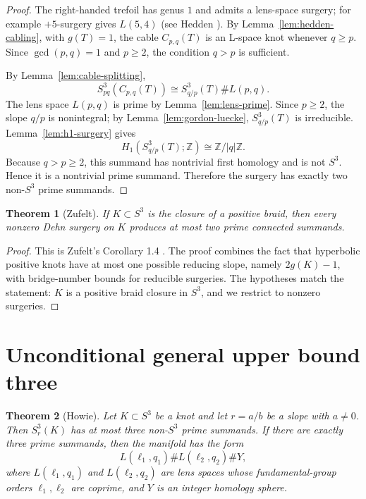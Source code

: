 \documentclass[12pt]{article}
\newtheorem{theorem}{Theorem}[section]
\theoremstyle{definition}
\newcommand{\Z}{\mathbb Z}
\begin{document}
\begin{proof}
The right-handed trefoil has genus \(1\) and admits a lens-space surgery; for example \(+5\)-surgery gives \(L(5,4)\) (see Hedden \cite[Section 1]{Hedden}).  By Lemma~\ref{lem:hedden-cabling}, with \(g(T)=1\), the cable \(C_{p,q}(T)\) is an L-space knot whenever \(q\ge p\).  Since \(\gcd(p,q)=1\) and \(p\ge 2\), the condition \(q>p\) is sufficient.

By Lemma~\ref{lem:cable-splitting},
\[
S^3_{pq}(C_{p,q}(T))
\cong
S^3_{q/p}(T)\# L(p,q).
\]
The lens space \(L(p,q)\) is prime by Lemma~\ref{lem:lens-prime}.  Since \(p\ge 2\), the slope \(q/p\) is nonintegral; by Lemma~\ref{lem:gordon-luecke}, \(S^3_{q/p}(T)\) is irreducible.  Lemma~\ref{lem:h1-surgery} gives
\[
H_1(S^3_{q/p}(T);\Z)\cong \Z/|q|\Z.
\]
Because \(q>p\ge 2\), this summand has nontrivial first homology and is not \(S^3\).  Hence it is a nontrivial prime summand.  Therefore the surgery has exactly two non-\(S^3\) prime summands.
\end{proof}

\begin{theorem}[Zufelt]\label{thm:positive-braid}
If \(K\subset S^3\) is the closure of a positive braid, then every nonzero Dehn surgery on \(K\) produces at most two prime connected summands.
\end{theorem}

\begin{proof}
This is Zufelt's Corollary 1.4 \cite{Zufelt}.  The proof combines the fact that hyperbolic positive knots have at most one possible reducing slope, namely \(2g(K)-1\), with bridge-number bounds for reducible surgeries.  The hypotheses match the statement: \(K\) is a positive braid closure in \(S^3\), and we restrict to nonzero surgeries.
\end{proof}

\section{Unconditional general upper bound three}
\label{sec:unconditional}

\begin{theorem}[Howie]\label{thm:howie-three}
Let \(K\subset S^3\) be a knot and let \(r=a/b\) be a slope with \(a\neq 0\).  Then \(S^3_r(K)\) has at most three non-\(S^3\) prime summands.  If there are exactly three prime summands, then the manifold has the form
\[
L(\ell_1,q_1)\# L(\ell_2,q_2)\# Y,
\]
where \(L(\ell_1,q_1)\) and \(L(\ell_2,q_2)\) are lens spaces whose fundamental-group orders \(\ell_1,\ell_2\) are coprime, and \(Y\) is an integer homology sphere.
\end{theorem}
\end{document}
